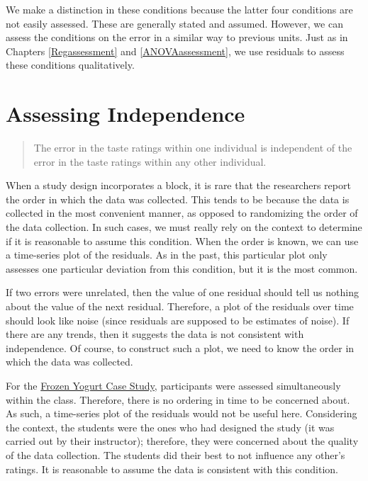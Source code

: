 \documentclass[]{book}
\theoremstyle{plain}
\theoremstyle{mydefn}
\theoremstyle{myexmpl}
\theoremstyle{remark}
\begin{document}
We make a distinction in these conditions because the latter four
conditions are not easily assessed. These are generally stated and
assumed. However, we can assess the conditions on the error in a similar
way to previous units. Just as in Chapters \ref{Regassessment} and
\ref{ANOVAassessment}, we use residuals to assess these conditions
qualitatively.

\section{Assessing Independence}\label{assessing-independence-2}

\begin{quote}
The error in the taste ratings within one individual is independent of
the error in the taste ratings within any other individual.
\end{quote}

When a study design incorporates a block, it is rare that the
researchers report the order in which the data was collected. This tends
to be because the data is collected in the most convenient manner, as
opposed to randomizing the order of the data collection. In such cases,
we must really rely on the context to determine if it is reasonable to
assume this condition. When the order is known, we can use a time-series
plot of the residuals. As in the past, this particular plot only
assesses one particular deviation from this condition, but it is the
most common.

If two errors were unrelated, then the value of one residual should tell
us nothing about the value of the next residual. Therefore, a plot of
the residuals over time should look like noise (since residuals are
supposed to be estimates of noise). If there are any trends, then it
suggests the data is not consistent with independence. Of course, to
construct such a plot, we need to know the order in which the data was
collected.

For the \protect\hyperlink{CaseOrganic}{Frozen Yogurt Case Study},
participants were assessed simultaneously within the class. Therefore,
there is no ordering in time to be concerned about. As such, a
time-series plot of the residuals would not be useful here. Considering
the context, the students were the ones who had designed the study (it
was carried out by their instructor); therefore, they were concerned
about the quality of the data collection. The students did their best to
not influence any other's ratings. It is reasonable to assume the data
is consistent with this condition.
\end{document}
